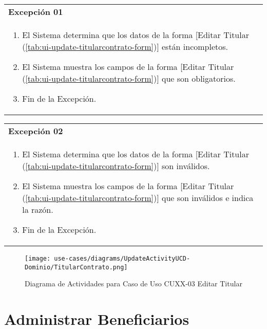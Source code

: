 	\begin{tabular}{ p{15.5cm} }
		\textbf{Excepci\'on 01} \\
		\begin{enumerate}
			\item El Sistema determina que los datos de la forma [Editar Titular (\ref{tab:ui-update-titularcontrato-form})] est\'an incompletos.
			\item El Sistema muestra los campos de la forma [Editar Titular (\ref{tab:ui-update-titularcontrato-form})] que son obligatorios.
			\item Fin de la Excepci\'on.
		\end{enumerate}
	\end{tabular}
	
	\begin{tabular}{ p{15.5cm} }
		\textbf{Excepci\'on 02} \\
		\begin{enumerate}
			\item El Sistema determina que los datos de la forma [Editar Titular (\ref{tab:ui-update-titularcontrato-form})] son inv\'alidos.
			\item El Sistema muestra los campos de la forma [Editar Titular (\ref{tab:ui-update-titularcontrato-form})] que son inv\'alidos e indica la raz\'on.
			\item Fin de la Excepci\'on.
		\end{enumerate}
	\end{tabular}
	
	\begin{figure}[H]
		\begin{center}
		 \label{tab:activity-update-ucd-entity-titularcontrato}
		 \texttt{[image: use-cases/diagrams/UpdateActivityUCD-Dominio/TitularContrato.png]}
		 \caption{Diagrama de Actividades para Caso de Uso CUXX-03 Editar Titular}
		\end{center}
	\end{figure}
	\clearpage
	\section{Administrar Beneficiarios} \label{sec:cf-uc-admin-beneficiario}
	
	\clearpage
